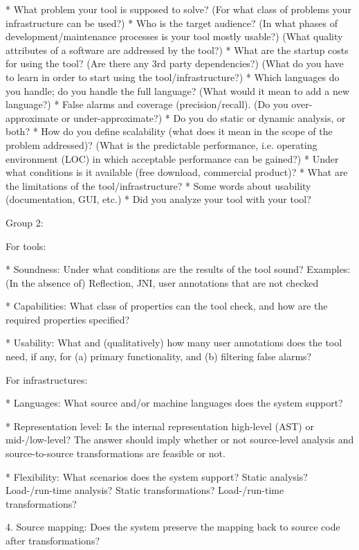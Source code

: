 {    * What problem your tool is supposed to solve? (For what class of problems your infrastructure can be used?)
    * Who is the target audience? (In what phases of development/maintenance processes is your tool mostly usable?) (What quality attributes of a software are addressed by the tool?)
    * What are the startup costs for using the tool? (Are there any 3rd party dependencies?) (What do you have to learn in order to start using the tool/infrastructure?)
    * Which languages do you handle; do you handle the full language? (What would it mean to add a new language?)
    * False alarms and coverage (precision/recall). (Do you over-approximate or under-approximate?)
    * Do you do static or dynamic analysis, or both?
    * How do you define scalability (what does it mean in the scope of the problem addressed)? (What is the predictable performance, i.e. operating environment (LOC) in which acceptable performance can be gained?)
    * Under what conditions is it available (free download, commercial product)?
    * What are the limitations of the tool/infrastructure?
    * Some words about usability (documentation, GUI, etc.)
    * Did you analyze your tool with your tool? 

Group 2:

For tools:

    * Soundness: Under what conditions are the results of the tool sound? Examples: (In the absence of) Reflection, JNI, user annotations that are not checked 

    * Capabilities: What class of properties can the tool check, and how are the required properties specified? 

    * Usability: What and (qualitatively) how many user annotations does the tool need, if any, for (a) primary functionality, and (b) filtering false alarms? 

For infrastructures:

    * Languages: What source and/or machine languages does the system support? 

    * Representation level: Is the internal representation high-level (AST) or mid-/low-level? The answer should imply whether or not source-level analysis and source-to-source transformations are feasible or not. 

    * Flexibility: What scenarios does the system support? Static analysis? Load-/run-time analysis? Static transformations? Load-/run-time transformations? 

4. Source mapping: Does the system preserve the mapping back to source code after transformations?


}
